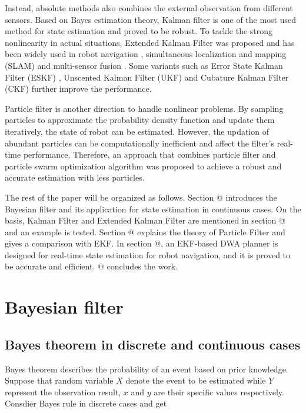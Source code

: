 \documentclass[conference]{IEEEtran}
\makeatletter
\newcommand{\Rmnum}[1]{\expandafter\@slowromancap\romannumeral #1@}
\makeatother
\begin{document}
	Instead, absolute methods also combines the external observation from different sensors. Based on Bayes estimation theory, Kalman filter is one of the most used method for state estimation and proved to be robust. To tackle the strong nonlinearity in actual situations, Extended Kalman Filter was proposed and has been widely used in robot navigation \cite{chen2012ekf}, simultaneous localization and mapping (SLAM) \cite{barrau2015ekf} and multi-sensor fusion \cite{park2016navigation}. Some variants such as Error State Kalman Filter (ESKF) \cite{xu2022error}, Unscented Kalman Filter (UKF) \cite{han2015ukf} and Cubature Kalman Filter (CKF) \cite{xu2019mcc} further improve the performance. 
	
	Particle filter is another direction to handle nonlinear problems. By sampling particles to approximate the probability density function and update them iteratively, the state of robot can be estimated. However, the updation of abundant particles can be computationally inefficient and affect the filter's real-time performance. Therefore, an approach that combines particle filter and particle swarm optimization algorithm \cite{zhang2019improved} was proposed to achieve a robust and accurate estimation with less particles.
	
	The rest of the paper will be organized as follows. Section \Rmnum{2} introduces the Bayesian filter and its application for state estimation in continuous cases. On the basis, Kalman Filter and Extended Kalman Filter are mentioned in section \Rmnum{3} and an example is tested. Section \Rmnum{4} explains the theory of Particle Filter and gives a comparison with EKF. In section \Rmnum{5}, an EKF-based DWA planner is designed for real-time state estimation for robot navigation, and it is proved to be accurate and efficient. \Rmnum{6} concludes the work.
	
	\section{Bayesian filter}
	
	\subsection{Bayes theorem in discrete and continuous cases}
	
	Bayes theorem describes the probability of an event based on prior knowledge. Suppose that random variable $X$ denote the event to be estimated while $Y$ represent the observation result, $x$ and $y$ are their specific values respectively. Consdier Bayes rule in discrete cases and get
	
\end{document}
